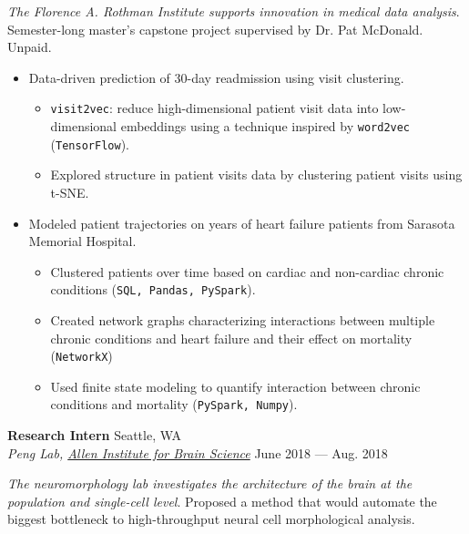 \documentclass[a4paper,12pt]{article}
\newcommand{\ressubheading}[4]{{\begin{minipage}{\textwidth}
                                    \textbf{#1} \hfill #2 \\
                                    \textit{#3} \hfill #4 \\
\end{minipage}}}
\begin{document}
    \vspace{-6pt} \textit{The Florence A. Rothman Institute supports innovation in medical data analysis}. Semester-long master's capstone project supervised by Dr. Pat McDonald. Unpaid.


    \begin{itemize}
        \item Data-driven prediction of 30-day readmission using visit clustering.

        \begin{itemize}
            \item \texttt{visit2vec}: reduce high-dimensional patient visit data into low-dimensional embeddings using a technique inspired by \texttt{word2vec} (\texttt{TensorFlow}).
            \item Explored structure in patient visits data by clustering patient visits using t-SNE\@.
        \end{itemize}



        \item Modeled patient trajectories on years of heart failure patients from Sarasota Memorial Hospital.
        \begin{itemize}
            \item Clustered patients over time based on cardiac and non-cardiac chronic conditions (\texttt{SQL, Pandas, PySpark}).
            \item Created network graphs characterizing interactions between multiple chronic conditions and heart failure and their effect on mortality (\texttt{NetworkX})
            \item Used finite state modeling to quantify interaction between chronic conditions and mortality (\texttt{PySpark, Numpy}).
        \end{itemize}

    \end{itemize}

    \ressubheading{Research Intern}{Seattle, WA}{Peng Lab, \href{alleninstitute.org}{Allen Institute for Brain Science}}{June 2018 --- Aug. 2018}

    \vspace{-6pt} \textit{The neuromorphology lab investigates the architecture of the brain at the population and single-cell level}. Proposed a method that would automate the biggest bottleneck to high-throughput neural cell morphological analysis.
\end{document}
